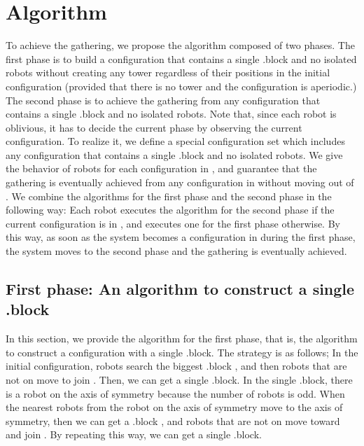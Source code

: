\documentclass[11pt]{article}
\begin{document}
\section{Algorithm}\label{sec:Algo}



To achieve the gathering, we propose the algorithm composed of two phases. The first phase is to build a configuration that contains a single .block and no isolated robots without creating any tower regardless of their positions in the initial configuration (provided that there is no tower and the configuration is aperiodic.)
The second phase is to achieve the gathering from any configuration that contains a single .block and no isolated robots. 
Note that, since each robot is oblivious, it has to decide the current phase by observing the current configuration. 
To realize it, we define a special configuration set  which includes any configuration that contains a single .block and no isolated robots. 
We give the behavior of robots for each configuration in , and guarantee that the gathering is eventually achieved from any configuration in  without moving out of . We combine the algorithms for the first phase and the second phase in the following way: Each robot executes the algorithm for the second phase if the current configuration is in , and executes one for the first phase otherwise. By this way, as soon as the system becomes a configuration in  during the first phase, the system moves to the second phase and the gathering is eventually achieved.

\subsection{First phase: An algorithm to construct a single .block}

In this section, we provide the algorithm for the first phase, that is, the algorithm to construct a configuration with a single .block. The strategy is as follows; 
In the initial configuration, robots search the biggest .block , and then robots that are not on  move to join .
Then, we can get a single .block.
In the single .block, there is a robot on the axis of symmetry because the number of robots is odd.
When the nearest robots from the robot on the axis of symmetry move to the axis of symmetry, then we can get a .block ,
and robots that are not on  move toward  and join .
By repeating this way, we can get a single .block. 
\end{document}
